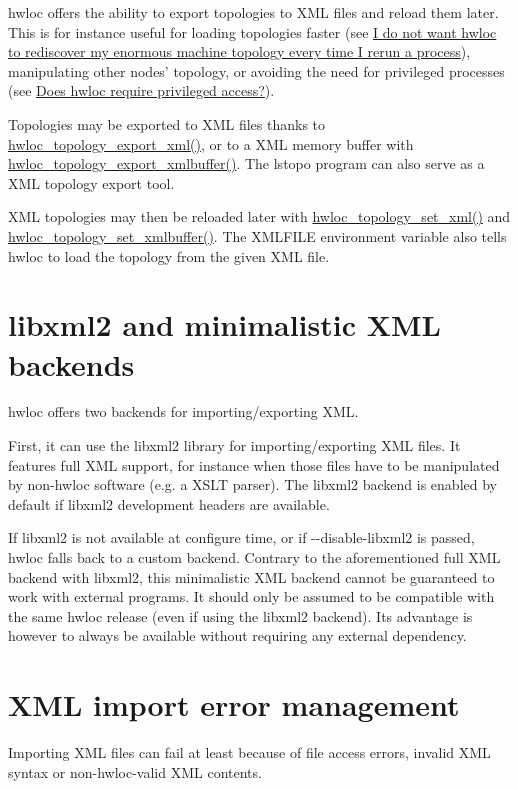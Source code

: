 hwloc offers the ability to export topologies to XML files and reload them later. This is for instance useful for loading topologies faster (see \hyperlink{a00011_faq_xml}{I do not want hwloc to rediscover my enormous machine topology every time I rerun a process}), manipulating other nodes' topology, or avoiding the need for privileged processes (see \hyperlink{a00011_faq_privileged}{Does hwloc require privileged access?}).

Topologies may be exported to XML files thanks to \hyperlink{a00045_ga45578d725c66865cfef31d0585dcff70}{hwloc\_\-topology\_\-export\_\-xml()}, or to a XML memory buffer with \hyperlink{a00045_ga739330e9402425315e44e5012631fb91}{hwloc\_\-topology\_\-export\_\-xmlbuffer()}. The lstopo program can also serve as a XML topology export tool.

XML topologies may then be reloaded later with \hyperlink{a00044_ga93efcc8a962afe1ed23393700682173f}{hwloc\_\-topology\_\-set\_\-xml()} and \hyperlink{a00044_gae7e4bade144652a2b48f5eaf0309b4ec}{hwloc\_\-topology\_\-set\_\-xmlbuffer()}. The XMLFILE environment variable also tells hwloc to load the topology from the given XML file.\hypertarget{a00007_xml_backends}{}\section{libxml2 and minimalistic XML backends}\label{a00007_xml_backends}
hwloc offers two backends for importing/exporting XML.

First, it can use the libxml2 library for importing/exporting XML files. It features full XML support, for instance when those files have to be manipulated by non-\/hwloc software (e.g. a XSLT parser). The libxml2 backend is enabled by default if libxml2 development headers are available.

If libxml2 is not available at configure time, or if {\ttfamily -\/-\/disable-\/libxml2} is passed, hwloc falls back to a custom backend. Contrary to the aforementioned full XML backend with libxml2, this minimalistic XML backend cannot be guaranteed to work with external programs. It should only be assumed to be compatible with the same hwloc release (even if using the libxml2 backend). Its advantage is however to always be available without requiring any external dependency.\hypertarget{a00007_xml_errors}{}\section{XML import error management}\label{a00007_xml_errors}
Importing XML files can fail at least because of file access errors, invalid XML syntax or non-\/hwloc-\/valid XML contents.

